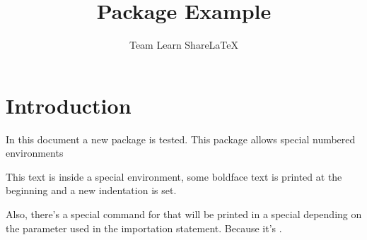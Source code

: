 \documentclass{article}
\title{Package Example}
\author{Team Learn ShareLaTeX}
\date{ }
\begin{document}
	
	\maketitle
	
	\section{Introduction}
	In this document a new package is tested. This package allows special numbered
	environments
	
	\begin{example}
		This text is inside a special environment, some boldface text is printed
		at the beginning and a new indentation is set.
	\end{example}
	
	Also, there's a special command for  that will be
	printed in a special  depending on the parameter used in the
	 importation statement. Because it's .
	
	\printindex
	
\end{document}
